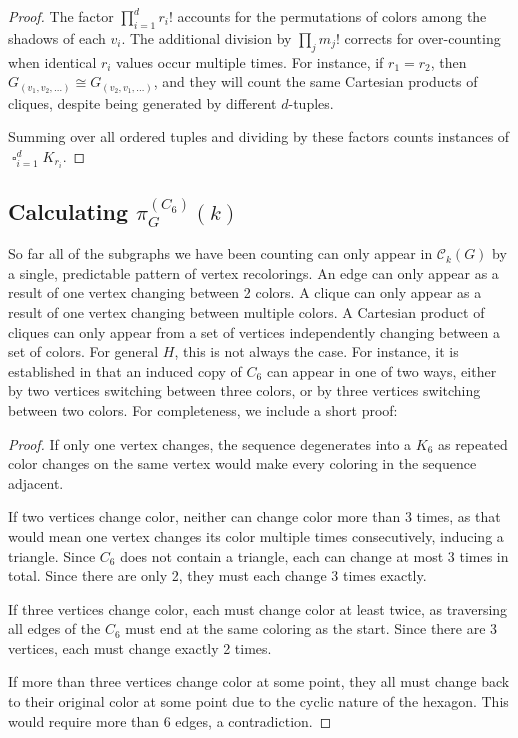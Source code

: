\documentclass[12pt,reqno,dvipsnames]{amsart}
\theoremstyle{definition}
\begin{document}
\begin{proof}
The factor $\prod_{i=1}^d r_i!$ accounts for the permutations of colors among the shadows of each $v_i$. The additional division by $\prod_{j} m_j!$ corrects for over-counting when identical $r_i$ values occur multiple times. For instance, if $r_1=r_2$, then $G_{(v_1, v_2, \ldots)}\cong G_{(v_2, v_1, \ldots)}$, and they will count the same Cartesian products of cliques, despite being generated by different $d$-tuples.

Summing over all ordered tuples and dividing by these factors counts instances of $\mathop{\square}_{i=1}^d K_{r_i}$.
\end{proof}

\subsection{Calculating \texorpdfstring{$\pi_G^{(C_6)}(k)$}{π\textasciicircum{}(C₆)(k)}}

So far all of the subgraphs we have been counting can only appear in $\mathcal{C}_k(G)$ by a single, predictable pattern of vertex recolorings. An edge can only appear as a result of one vertex changing between 2 colors. A clique can only appear as a result of one vertex changing between multiple colors. A Cartesian product of cliques can only appear from a set of vertices independently changing between a set of colors. For general $H$, this is not always the case. For instance, it is established in \cite{ABFR17} that an induced copy of $C_6$ can appear in one of two ways, either by two vertices switching between three colors, or by three vertices switching between two colors. For completeness, we include a short proof:
\begin{proof}
    If only one vertex changes, the sequence degenerates into a $K_6$ as repeated color changes on the same vertex would make every coloring in the sequence adjacent. 

    If two vertices change color, neither can change color more than 3 times, as that would mean one vertex changes its color multiple times consecutively, inducing a triangle. Since $C_6$ does not contain a triangle, each can change at most 3 times in total. Since there are only 2, they must each change 3 times exactly.

    If three vertices change color, each must change color at least twice, as traversing all edges of the $C_6$ must end at the same coloring as the start. Since there are 3 vertices, each must change exactly 2 times.
    
    If more than three vertices change color at some point, they all must change back to their original color at some point due to the cyclic nature of the hexagon. This would require more than 6 edges, a contradiction.
\end{proof}
\end{document}
